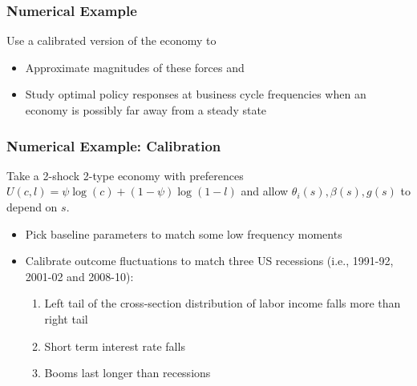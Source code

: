 \documentclass{beamer}
\begin{document}
\begin{frame}
 \frametitle{Numerical Example}

 Use a  calibrated version of the economy to
 \begin{itemize}
  \item Approximate magnitudes of these forces and
  \item Study optimal policy responses at business cycle frequencies when an economy is possibly far away from a steady state
 \end{itemize}
 \end{frame}
 \begin{frame}
 \frametitle{Numerical Example: Calibration}
Take a 2-shock 2-type economy with preferences $U(c,l)=\psi \log(c)+(1-\psi)\log(1-l)$ and allow $\theta_i(s),\beta(s),g(s)$ to depend on $s$.

 \begin{itemize}

 \item Pick  baseline parameters to match some low frequency moments

 \item Calibrate outcome fluctuations to match three US recessions (i.e., 1991-92, 2001-02 and 2008-10):

 \begin{enumerate}
  \item Left tail of the cross-section distribution of labor income falls more than right tail
  \item Short term interest rate falls
  \item Booms last longer than recessions
 \end{enumerate}

 \end{itemize}

\end{frame}
\end{document}
